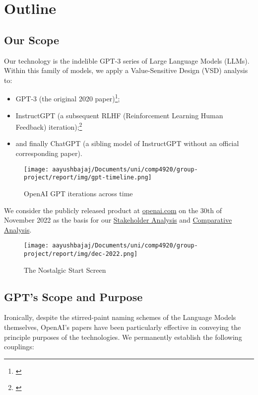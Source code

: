 \newpage

\section{Outline}

\subsection{Our Scope}

Our technology is the indelible GPT-3 series of Large Language Models (LLMs). Within this family of models, we apply a Value-Sensitive Design (VSD) analysis to:

\begin{itemize}
\item GPT-3 (the original 2020 paper)\footnote{\cite{gpt3}};
\item InstructGPT (a subsequent RLHF (Reinforcement Learning Human Feedback) iteration);\footnote{\cite{instructgpt}}
\item and finally ChatGPT (a sibling model of InstructGPT without an official corresponding paper).
\end{itemize}


\begin{figure}[h]
    \centering
    \texttt{[image: aayushbajaj/Documents/uni/comp4920/group-project/report/img/gpt-timeline.png]}
    \caption{OpenAI GPT iterations across time}
    \label{fig:image1}
\end{figure}

We consider the publicly released product at \href{https://openai.com/}{openai.com} on the 30th of November 2022 as the basis for our \hyperlink{section.2}{Stakeholder Analysis} and \hyperlink{section.4}{Comparative Analysis}.

\begin{figure}[h]
    \centering
    \texttt{[image: aayushbajaj/Documents/uni/comp4920/group-project/report/img/dec-2022.png]}
    \caption{The Nostalgic Start Screen}
    \label{fig:image1}
\end{figure}

\subsection{GPT's Scope and Purpose}

Ironically, despite the stirred-paint naming schemes of the Language Models themselves, OpenAI's papers have been particularly effective in conveying the principle purposes of the technologies. We permanently establish the following couplings:

